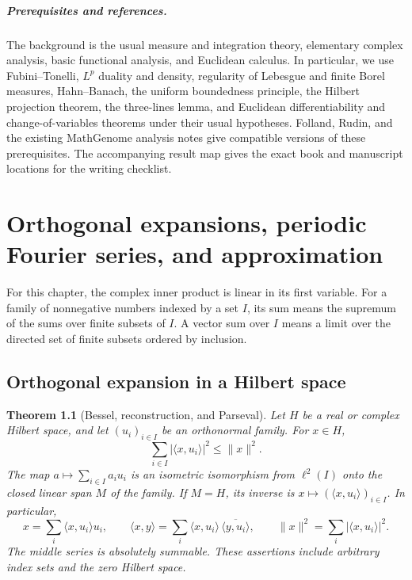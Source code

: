 \documentclass[11pt,oneside,openany]{book}
\newtheorem{theorem}{Theorem}[chapter]
\theoremstyle{definition}
\theoremstyle{remark}
\begin{document}
\paragraph{Prerequisites and references.}
The background is the usual measure and integration theory, elementary complex analysis, basic functional analysis, and Euclidean calculus. In particular, we use Fubini--Tonelli, \(L^p\) duality and density, regularity of Lebesgue and finite Borel measures, Hahn--Banach, the uniform boundedness principle, the Hilbert projection theorem, the three-lines lemma, and Euclidean differentiability and change-of-variables theorems under their usual hypotheses. Folland, Rudin, and the existing MathGenome analysis notes give compatible versions of these prerequisites. The accompanying result map gives the exact book and manuscript locations for the writing checklist.

{\small\tableofcontents}
\mainmatter
\chapter[Orthogonal expansions]
{Orthogonal expansions, periodic Fourier series, and approximation}
\label{p102:u1}

For this chapter, the complex inner product is linear in its first variable.
For a family of nonnegative numbers indexed by a set $I$, its sum means the
supremum of the sums over finite subsets of $I$. A vector sum over $I$
means a limit over the directed set of finite subsets ordered by inclusion.

\section{Orthogonal expansion in a Hilbert space}

\begin{theorem}[Bessel, reconstruction, and Parseval]
\label{p102:AN-13-C04-R01}
Let $H$ be a real or complex Hilbert space, and let $(u_i)_{i\in I}$ be an
orthonormal family. For $x\in H$,
\[
  \sum_{i\in I} |\langle x,u_i\rangle|^2\le \|x\|^2.
\]
The map $a\mapsto\sum_{i\in I}a_i u_i$ is an isometric isomorphism from
$\ell^2(I)$ onto the closed linear span $M$ of the family. If $M=H$, its
inverse is $x\mapsto(\langle x,u_i\rangle)_{i\in I}$. In particular,
\[
 x=\sum_i\langle x,u_i\rangle u_i,\qquad
 \langle x,y\rangle
 =\sum_i\langle x,u_i\rangle\,\overline{\langle y,u_i\rangle},
 \qquad
 \|x\|^2=\sum_i|\langle x,u_i\rangle|^2.
\]
The middle series is absolutely summable. These assertions include
arbitrary index sets and the zero Hilbert space.
\end{theorem}
\end{document}
